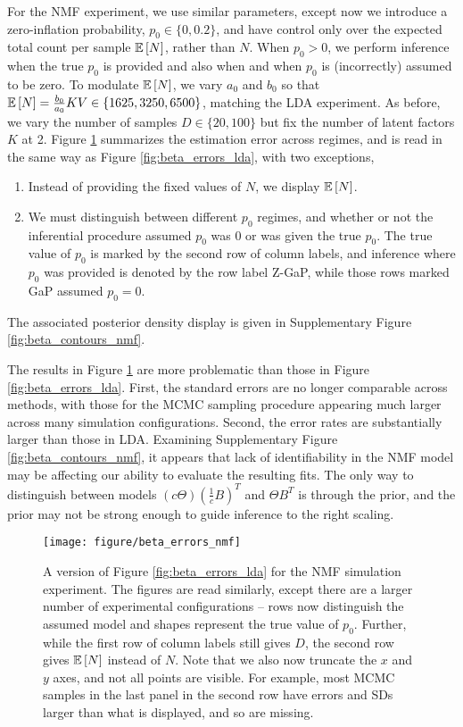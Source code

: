 \documentclass[oupdraft]{bio}
\begin{document}
For the NMF experiment, we use similar parameters, except now we introduce a
zero-inflation probability, $p_{0} \in \{0, 0.2\}$, and have control only over
the expected total count per sample $\mathbb{E}\left[{N}\right]$, rather than $N$. When $p_{0} >
0$, we perform inference when the true $p_0$ is provided and also when and when
$p_{0}$ is (incorrectly) assumed to be zero. To modulate $\mathbb{E}\left[{N}\right]$, we vary
$a_{0}$ and $b_{0}$ so that $\mathbb{E}\left[{N}\right] = \frac{b_{0}}{a_{0}}KV \in \{1625, 3250,
6500\}$, matching the LDA experiment. As before, we vary the number of samples
$D \in \{20, 100\}$ but fix the number of latent factors $K$ at 2. Figure
\ref{fig:beta_errors_nmf} summarizes the estimation error across regimes, and
is read in the same way as Figure \ref{fig:beta_errors_lda}, with two
exceptions,
\begin{enumerate}
\item Instead of providing the fixed values of $N$, we display $\mathbb{E}\left[{N}\right]$.
\item We must distinguish between different $p_{0}$ regimes, and whether or not
  the inferential procedure assumed $p_{0}$ was 0 or was given the true $p_{0}$.
  The true value of $p_0$ is marked by the second row of column labels, and
  inference where $p_{0}$ was provided is denoted by the row label Z-GaP, while
  those rows marked GaP assumed $p_{0} = 0$.
\end{enumerate}
The associated posterior density display is given in Supplementary Figure
\ref{fig:beta_contours_nmf}.

The results in Figure \ref{fig:beta_errors_nmf} are more problematic than those
in Figure \ref{fig:beta_errors_lda}. First, the standard errors are no longer
comparable across methods, with those for the MCMC sampling procedure appearing
much larger across many simulation configurations. Second, the error rates are
substantially larger than those in LDA. Examining Supplementary Figure
\ref{fig:beta_contours_nmf}, it appears that lack of identifiability in the NMF
model may be affecting our ability to evaluate the resulting fits. The only way
to distinguish between models $\left(c\Theta\right)\left(\frac{1}{c}
B\right)^{T}$ and $\Theta B^{T}$ is through the prior, and the prior may not be
strong enough to guide inference to the right scaling.

\begin{figure}[!p]
  \centering
  \texttt{[image: figure/beta\_errors\_nmf]}
  \caption{A version of Figure \ref{fig:beta_errors_lda} for the NMF simulation
    experiment. The figures are read similarly, except there are a larger number
    of experimental configurations -- rows now distinguish the assumed model and
    shapes represent the true value of $p_{0}$. Further, while the first row of
    column labels still gives $D$, the second row gives $\mathbb{E}\left[{N}\right]$ instead of
    $N$. Note that we also now truncate the $x$ and $y$ axes, and not all points
    are visible. For example, most MCMC samples in the last panel in the second
    row have errors and SDs larger than what is displayed, and so are
    missing. \label{fig:beta_errors_nmf}}
\end{figure}
\end{document}

